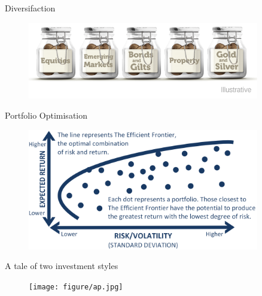 \documentclass[handout]{beamer}
\begin{document}
\begin{frame}{Diversifaction}
  \begin{figure}
    \centering
    \includegraphics[width = 0.9\textwidth]{figure/allegg2.png}
  \end{figure}
\end{frame}

\begin{frame}{Portfolio Optimisation}
  \begin{figure}
    \centering
    \includegraphics[width = 0.9\textwidth]{figure/mpt.png}
  \end{figure}
\end{frame}

\begin{frame}{A tale of two investment styles}

  \begin{figure}
    \centering
    \texttt{[image: figure/ap.jpg]}
  \end{figure}
\end{frame}
\end{document}
